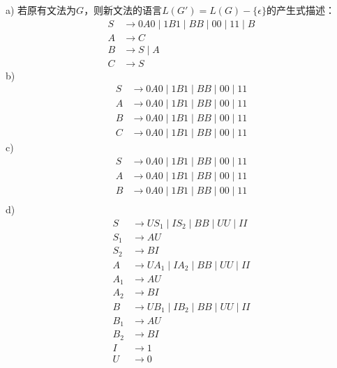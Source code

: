 \begin{solution}
a) 若原有文法为$G$，则新文法的语言$L(G')=L(G)-\{\epsilon\}$的产生式描述：
\begin{align*}
    S &\rightarrow 0A0 \mid 1B1 \mid BB \mid 00 \mid 11 \mid B\\
    A &\rightarrow C\\
    B &\rightarrow S \mid A\\
    C &\rightarrow S
\end{align*}
b)
\begin{align*}
    S &\rightarrow 0A0 \mid 1B1 \mid BB \mid 00 \mid 11\\
    A &\rightarrow 0A0 \mid 1B1 \mid BB \mid 00 \mid 11\\
    B &\rightarrow 0A0 \mid 1B1 \mid BB \mid 00 \mid 11\\
    C &\rightarrow 0A0 \mid 1B1 \mid BB \mid 00 \mid 11
\end{align*}
c)
\begin{align*}
    S &\rightarrow 0A0 \mid 1B1 \mid BB \mid 00 \mid 11\\
    A &\rightarrow 0A0 \mid 1B1 \mid BB \mid 00 \mid 11\\
    B &\rightarrow 0A0 \mid 1B1 \mid BB \mid 00 \mid 11\\
\end{align*}
d)
\begin{align*}
    S &\rightarrow US_1 \mid IS_2 \mid BB \mid UU \mid II\\
    S_1 &\rightarrow AU\\
    S_2 &\rightarrow BI\\
    A &\rightarrow UA_1 \mid IA_2 \mid BB \mid UU \mid II\\
    A_1 &\rightarrow AU\\
    A_2 &\rightarrow BI\\
    B &\rightarrow UB_1 \mid IB_2 \mid BB \mid UU \mid II\\
    B_1 &\rightarrow AU\\
    B_2 &\rightarrow BI\\
    I &\rightarrow 1\\
    U &\rightarrow 0
\end{align*}
\end{solution}